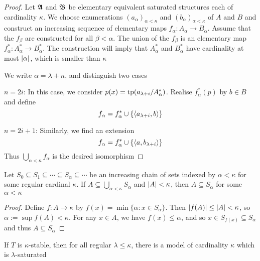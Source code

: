 \documentclass[11pt]{article}
\begin{document}
\begin{proof}
Let \(\mathfrak{A}\) and \(\mathfrak{B}\) be elementary equivalent saturated structures each of cardinality \(\kappa\). We
choose enumerations \((a_\alpha)_{\alpha<\kappa}\) and \((b_\alpha)_{\alpha<\kappa}\) of \(A\) and \(B\) and construct an
increasing sequence of elementary maps \(f_\alpha:A_\alpha\to B_\alpha\). Assume that the \(f_\beta\) are constructed
for all \(\beta<\alpha\). The union of the \(f_\beta\) is an elementary map \(f_\alpha^*:A_\alpha^*\to B_\alpha^*\). The
construction will imply that \(A_\alpha^*\) and \(B_\alpha^*\) have cardinality at most \(\abs{\alpha}\), which
is smaller than \(\kappa\)

We write \(\alpha=\lambda+n\), and distinguish two cases

\(n=2i\): In this case, we consider \(p(x)=\operatorname{tp}(a_{\lambda+i}/A_\alpha^*)\). Realise \(f_\alpha^*(p)\) by \(b\in B\)
and define
\begin{equation*}
f_\alpha=f_\alpha^*\cup\{\langle a_{\lambda+i},b\rangle\}
\end{equation*}

\(n=2i+1\): Similarly, we find an extension
\begin{equation*}
f_\alpha=f_\alpha^*\cup\{\langle a,b_{\lambda+i}\rangle\}
\end{equation*}
Thus \(\bigcup_{\alpha<\kappa}f_\alpha\) is the desired isomorphism
\end{proof}

\begin{lemma}[]
Let \(S_0\subseteq S_1\subseteq\cdots\subseteq S_\alpha\subseteq\cdots\) be an increasing chain of sets indexed by \(\alpha<\kappa\) for some regular
cardinal \(\kappa\). If \(A\subseteq\bigcup_{\alpha<\kappa}S_\alpha\) and \(\abs{A}<\kappa\), then \(A\subseteq S_\alpha\) for some \(\alpha<\kappa\)
\end{lemma}

\begin{proof}
Define \(f:A\to\kappa\) by \(f(x)=\min\{\alpha:x\in S_\alpha\}\). Then \(\abs{f(A)}\le\abs{A}<\kappa\),
so \(\alpha:=\sup f(A)<\kappa\). For any \(x\in A\), we have \(f(x)\le\alpha\), and so \(x\in S_{f(x)}\subseteq S_\alpha\) and
thus \(A\subseteq S_\alpha\)
\end{proof}

\begin{lemma}[]
\label{lemma5.2.9}
If \(T\) is \(\kappa\)-stable, then for all regular \(\lambda\le\kappa\), there is a model of cardinality \(\kappa\) which is \(\lambda\)-saturated
\end{lemma}
\end{document}
